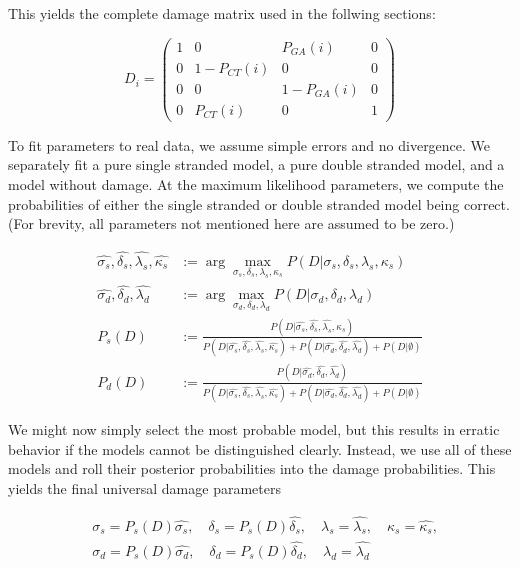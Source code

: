 \documentclass{article}
\begin{document}
This yields the complete damage matrix used in the follwing sections:

\begin{equation}
D_i = \left( \begin{array}{cccc}
            1 &      0      &  P_{GA}(i)  & 0 \\
            0 & 1-P_{CT}(i) &      0      & 0 \\
            0 &      0      & 1-P_{GA}(i) & 0 \\
            0 &  P_{CT}(i)  &      0      & 1 
        \end{array} \right)
\end{equation}        

To fit parameters to real data, we assume simple errors and no divergence.  We separately fit a pure single stranded model, a pure
double stranded model, and a model without damage.  At the maximum likelihood parameters, we compute the probabilities of either the
single stranded or double stranded model being correct.  (For brevity, all parameters not mentioned here are assumed to be zero.)

\begin{align*}
\hat{\sigma_s}, \hat{\delta_s}, \hat{\lambda_s}, \hat{\kappa_s} &:= \arg \max_{\sigma_s, \delta_s, \lambda_s, \kappa_s}
    P(D | \sigma_s, \delta_s, \lambda_s, \kappa_s ) \\
\hat{\sigma_d}, \hat{\delta_d}, \hat{\lambda_d} &:= \arg \max_{\sigma_d, \delta_d, \lambda_d}
    P(D | \sigma_d, \delta_d, \lambda_d ) \\
P_s(D) &:= \frac{   
    P(D | \hat{\sigma_s}, \hat{\delta_s}, \hat{\lambda_s}, \hat{\kappa_s}) }{
    P(D | \hat{\sigma_s}, \hat{\delta_s}, \hat{\lambda_s}, \hat{\kappa_s}) +
    P(D | \hat{\sigma_d}, \hat{\delta_d}, \hat{\lambda_d} ) +
    P(D | \emptyset ) } \\
P_d(D) &:= \frac{   
    P(D | \hat{\sigma_d}, \hat{\delta_d}, \hat{\lambda_d} ) }{
    P(D | \hat{\sigma_s}, \hat{\delta_s}, \hat{\lambda_s}, \hat{\kappa_s}) +
    P(D | \hat{\sigma_d}, \hat{\delta_d}, \hat{\lambda_d} ) +
    P(D | \emptyset ) }
\end{align*}

We might now simply select the most probable model, but this results in erratic behavior if the models cannot be distinguished
clearly.  Instead, we use all of these models and roll their posterior probabilities into the damage probabilities.  This yields the
final universal damage parameters

\begin{align*}
&\sigma_s = P_s(D) \hat{\sigma_s}, \quad 
\delta_s = P_s(D) \hat{\delta_s}, \quad 
\lambda_s = \hat{\lambda_s}, \quad
\kappa_s = \hat{\kappa_s}, \\
&\sigma_d = P_s(D) \hat{\sigma_d}, \quad 
\delta_d = P_s(D) \hat{\delta_d}, \quad 
\lambda_d = \hat{\lambda_d}
\end{align*}
\end{document}
